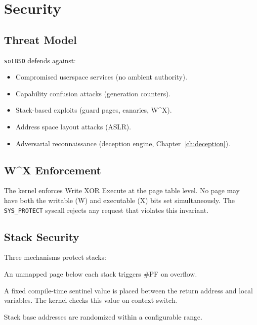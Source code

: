 \documentclass[11pt,a4paper,twoside]{report}
\theoremstyle{definition}
\newcommand{\sotBSD}{\texttt{sotBSD}}
\newcommand{\syscall}[1]{\texttt{#1}}
\begin{document}
\chapter{Security}
\label{ch:security}

\section{Threat Model}

\sotBSD{} defends against:
\begin{itemize}[leftmargin=1.4em]
  \item Compromised userspace services (no ambient authority).
  \item Capability confusion attacks (generation counters).
  \item Stack-based exploits (guard pages, canaries, W\^{}X).
  \item Address space layout attacks (ASLR).
  \item Adversarial reconnaissance (deception engine, Chapter~\ref{ch:deception}).
\end{itemize}

\section{W\^{}X Enforcement}

The kernel enforces Write XOR Execute at the page table level. No page may
have both the writable (W) and executable (X) bits set simultaneously. The
\syscall{SYS\_PROTECT} syscall rejects any request that violates this
invariant.

\section{Stack Security}

Three mechanisms protect stacks:
\begin{description}[leftmargin=1.4em]
  \item[Guard pages.] An unmapped page below each stack triggers \#PF on
    overflow.
  \item[Stack canaries.] A fixed compile-time sentinel value is placed
    between the return address and local variables. The kernel checks this
    value on context switch.
  \item[ASLR.] Stack base addresses are randomized within a configurable
    range.
\end{description}
\end{document}
